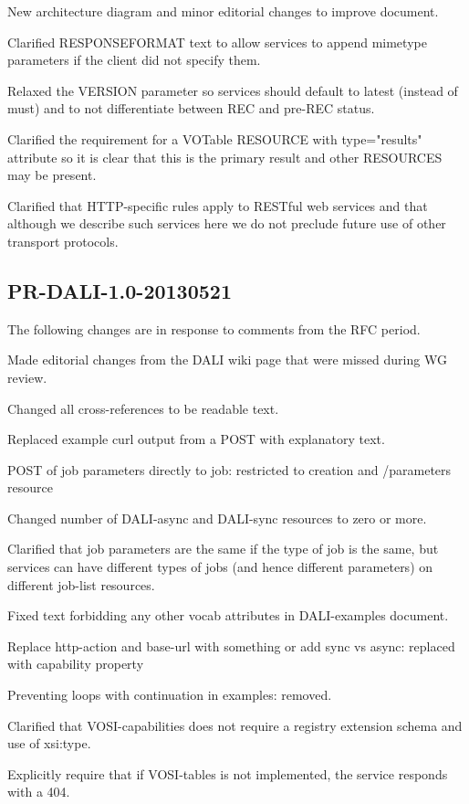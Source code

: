 \documentclass[11pt,letter]{ivoa}
\begin{document}
New architecture diagram and minor editorial changes to improve document.

Clarified RESPONSEFORMAT text to allow services to append mimetype parameters if 
the client did not specify them.

Relaxed the VERSION parameter so services should default to latest (instead of 
must) and to not differentiate between REC and pre-REC status.

Clarified the requirement for a VOTable RESOURCE with type="results" attribute 
so it is clear that this is the primary result and other RESOURCES may be 
present.

Clarified that HTTP-specific rules apply to RESTful web services and that 
although we describe such services here we do not preclude future use of other 
transport protocols.

\subsection{PR-DALI-1.0-20130521}
The following changes are in response to comments from the RFC period.

Made editorial changes from the DALI wiki page that were missed during WG 
review.

Changed all cross-references to be readable text.

Replaced example curl output from a POST with explanatory text.

POST of job parameters directly to job: restricted to creation and /parameters 
resource

Changed number of DALI-async and DALI-sync resources to zero or more.

Clarified that job parameters are the same if the type of job is the same, but 
services can have different types of jobs (and hence different parameters) on 
different job-list resources.

Fixed text forbidding any other vocab attributes in DALI-examples document.

Replace http-action and base-url with something or add sync vs async: replaced 
with capability property

Preventing loops with continuation in examples: removed.

Clarified that VOSI-capabilities does not require a registry extension schema 
and use of xsi:type.

Explicitly require that if VOSI-tables is not implemented, the service responds 
with a 404.
\end{document}
